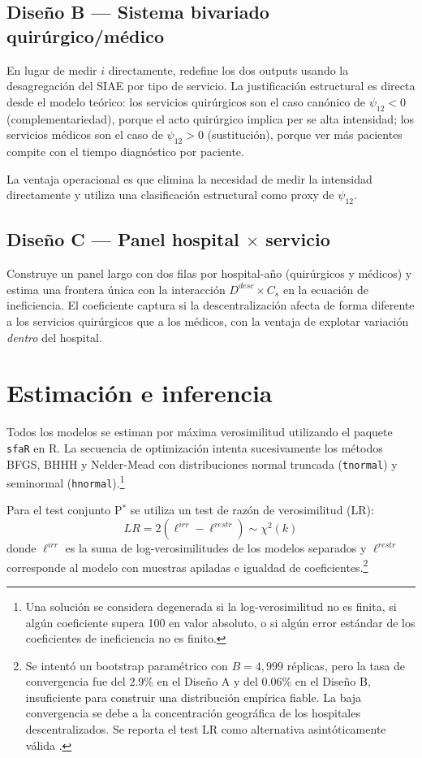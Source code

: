 \documentclass[12pt, a4paper, twoside, openright]{book}
\theoremstyle{plain}
\theoremstyle{definition}
\theoremstyle{remark}
\begin{document}
\subsection{Diseño B --- Sistema bivariado quirúrgico/médico}

En lugar de medir $i$ directamente, redefine los dos outputs usando la desagregación del SIAE por tipo de servicio. La justificación estructural es directa desde el modelo teórico: los servicios quirúrgicos son el caso canónico de $\psi_{12} < 0$ (complementariedad), porque el acto quirúrgico implica per se alta intensidad; los servicios médicos son el caso de $\psi_{12} > 0$ (sustitución), porque ver más pacientes compite con el tiempo diagnóstico por paciente.

La ventaja operacional es que elimina la necesidad de medir la intensidad directamente y utiliza una clasificación estructural como proxy de $\psi_{12}$.

\subsection{Diseño C --- Panel hospital \texorpdfstring{$\times$}{x} servicio}

Construye un panel largo con dos filas por hospital-año (quirúrgicos y médicos) y estima una frontera única con la interacción $D^{desc}\times C_s$ en la ecuación de ineficiencia. El coeficiente captura si la descentralización afecta de forma diferente a los servicios quirúrgicos que a los médicos, con la ventaja de explotar variación \textit{dentro} del hospital.

\section{Estimación e inferencia}

Todos los modelos se estiman por máxima verosimilitud utilizando el paquete \texttt{sfaR} \citep{dakpo2024} en R. La secuencia de optimización intenta sucesivamente los métodos BFGS, BHHH y Nelder-Mead con distribuciones normal truncada (\texttt{tnormal}) y seminormal (\texttt{hnormal}).\footnote{Una solución se considera degenerada si la log-verosimilitud no es finita, si algún coeficiente supera 100 en valor absoluto, o si algún error estándar de los coeficientes de ineficiencia no es finito.}

Para el test conjunto P$^*$ se utiliza un test de razón de verosimilitud (LR):
\begin{equation}
  LR = 2\left(\ell^{irr} - \ell^{restr}\right) \sim \chi^2(k)
  \label{eq:lr_test}
\end{equation}
donde $\ell^{irr}$ es la suma de log-verosimilitudes de los modelos separados y $\ell^{restr}$ corresponde al modelo con muestras apiladas e igualdad de coeficientes.\footnote{Se intentó un bootstrap paramétrico con $B=4{,}999$ réplicas, pero la tasa de convergencia fue del 2.9\% en el Diseño A y del 0.06\% en el Diseño B, insuficiente para construir una distribución empírica fiable. La baja convergencia se debe a la concentración geográfica de los hospitales descentralizados. Se reporta el test LR como alternativa asintóticamente válida \citep{simar2007}.}
\end{document}
